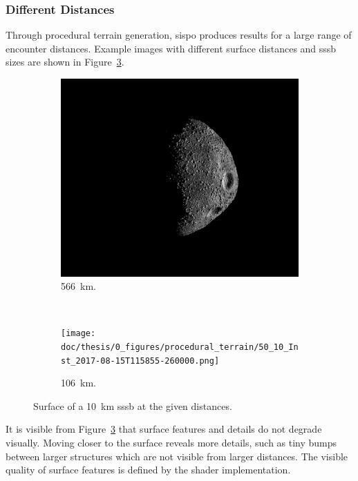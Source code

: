 \subsubsection{Different Distances}
Through procedural terrain generation, \gls{sispo} produces results for a large range of encounter distances. Example images with different surface distances and \gls{sssb} sizes are shown in Figure~\ref{fig:img_procedural_10k}.

\begin{figure}[htb]
    \centering
        \begin{subfigure}[b]{0.75\textwidth}
            \centering
            \includegraphics[width=\textwidth]{doc/thesis/0_figures/procedural_terrain/50_10_Inst_2017-08-15T115755-845000.png}
            \caption{\SI{566}{\kilo\meter}.}
            \label{fig:img_procedural_500}
        \end{subfigure}
        \\
        \begin{subfigure}[b]{0.75\textwidth}
            \centering
            \texttt{[image: doc/thesis/0\_figures/procedural\_terrain/50\_10\_Inst\_2017-08-15T115855-260000.png]}
            \caption{\SI{106}{\kilo\meter}.}
            \label{fig:img_procedural_100}
        \end{subfigure}
    \caption{Surface of a \SI{10}{\kilo\meter} \gls{sssb} at the given distances.}
    \label{fig:img_procedural_10k}
\end{figure}

It is visible from Figure~\ref{fig:img_procedural_10k} that surface features and details do not degrade visually. Moving closer to the surface reveals more details, such as tiny bumps between larger structures which are not visible from larger distances. The visible quality of surface features is defined by the shader implementation. 

